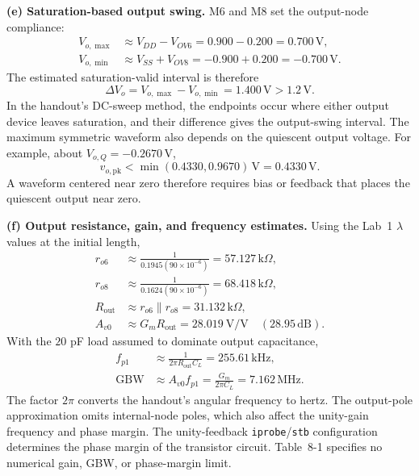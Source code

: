 \documentclass[12pt,letterpaper]{article}
\newcommand{\kohm}{\,\mathrm{k}\Omega}
\newcommand{\V}{\,\mathrm{V}}
\newcommand{\MHz}{\,\mathrm{MHz}}
\newcommand{\kHz}{\,\mathrm{kHz}}
\begin{document}
\begin{enumerate}
\newpage
\textbf{(e) Saturation-based output swing.}
M6 and M8 set the output-node compliance:
\begin{align*}
V_{o,\max}&\approx V_{DD}-V_{OV6}=0.900-0.200=0.700\V,\\
V_{o,\min}&\approx V_{SS}+V_{OV8}=-0.900+0.200=-0.700\V.
\end{align*}
The estimated saturation-valid interval is therefore
\[
\boxed{\Delta V_o=V_{o,\max}-V_{o,\min}=1.400\V>1.2\V.}
\]
In the handout's DC-sweep method, the endpoints occur where either
output device leaves saturation, and their difference gives the
output-swing interval. The maximum symmetric waveform also
depends on the quiescent output voltage.
For example, about $V_{o,Q}=-0.2670\V$,
\[
v_{o,\mathrm{pk}}<\min(0.4330,0.9670)\V=0.4330\V.
\]
A waveform centered near zero therefore requires bias or feedback
that places the quiescent output near zero.

\textbf{(f) Output resistance, gain, and frequency estimates.}
Using the Lab~1 $\lambda$ values at the initial length,
\begin{align*}
r_{o6}&\approx\frac{1}{0.1945(90\times10^{-6})}=57.127\kohm,\\
r_{o8}&\approx\frac{1}{0.1624(90\times10^{-6})}=68.418\kohm,\\
R_{\mathrm{out}}&\approx r_{o6}\parallel r_{o8}=31.132\kohm,\\
A_{v0}&\approx G_mR_{\mathrm{out}}=28.019\ \mathrm{V/V}
\quad(28.95\,\mathrm{dB}).
\end{align*}
With the $20$ pF load assumed to dominate output capacitance,
\begin{align*}
f_{p1}&\approx\frac{1}{2\pi R_{\mathrm{out}}C_L}
=255.61\kHz,\\
\mathrm{GBW}&\approx A_{v0}f_{p1}
=\frac{G_m}{2\pi C_L}=7.162\MHz.
\end{align*}
The factor $2\pi$ converts the handout's angular frequency to hertz.
The output-pole approximation omits internal-node poles, which
also affect the unity-gain frequency and phase margin. The
unity-feedback \texttt{iprobe}/\texttt{stb} configuration determines
the phase margin of the transistor circuit. Table~8-1 specifies no
numerical gain, GBW, or phase-margin limit.


\end{enumerate}
\end{document}
